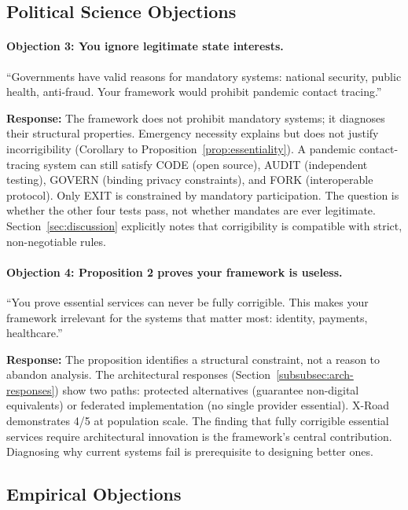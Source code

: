 \documentclass{article}
\begin{document}
\subsection{Political Science Objections}

\paragraph{Objection 3: You ignore legitimate state interests.}
``Governments have valid reasons for mandatory systems: national security, public health, anti-fraud. Your framework would prohibit pandemic contact tracing.''

\textbf{Response:} The framework does not prohibit mandatory systems; it diagnoses their structural properties. Emergency necessity explains but does not justify incorrigibility (Corollary to Proposition~\ref{prop:essentiality}). A pandemic contact-tracing system can still satisfy CODE (open source), AUDIT (independent testing), GOVERN (binding privacy constraints), and FORK (interoperable protocol). Only EXIT is constrained by mandatory participation. The question is whether the other four tests pass, not whether mandates are ever legitimate. Section~\ref{sec:discussion} explicitly notes that corrigibility is compatible with strict, non-negotiable rules.

\paragraph{Objection 4: Proposition 2 proves your framework is useless.}
``You prove essential services can never be fully corrigible. This makes your framework irrelevant for the systems that matter most: identity, payments, healthcare.''

\textbf{Response:} The proposition identifies a structural constraint, not a reason to abandon analysis. The architectural responses (Section~\ref{subsubsec:arch-responses}) show two paths: protected alternatives (guarantee non-digital equivalents) or federated implementation (no single provider essential). X-Road demonstrates 4/5 at population scale. The finding that fully corrigible essential services require architectural innovation is the framework's central contribution. Diagnosing why current systems fail is prerequisite to designing better ones.

\subsection{Empirical Objections}
\end{document}
